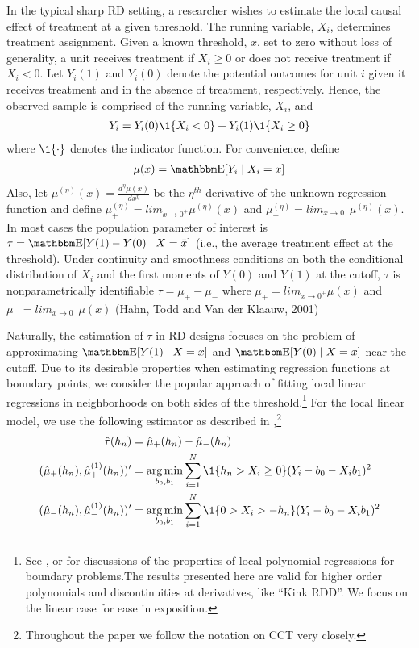 \documentclass[12pt,fleqn]{article}
\begin{document}
In the typical sharp RD setting, a researcher wishes to estimate the local 
causal effect of treatment at a given threshold. The running variable, $X_{i}$, 
determines treatment assignment.  Given a known threshold, $\bar{x}$, set to 
zero without loss of generality, a unit receives treatment if $X_{i} \geq 0$ or 
does not receive treatment if $X_{i} < 0$. Let $Y_{i}(1)$ and $Y_{i}(0)$ denote 
the potential outcomes for unit $i$ given it receives treatment and
 in the absence of treatment, respectively. Hence, the observed sample is 
 comprised of the running variable, $X_{i}$, and
 \begin{align}
  Y_{i}=Y_{i}(0) \1\{X_{i}<0\}+Y_{i}(1) \1\{X_{i} \geq 0\}
 \end{align}
where $\1\{ \cdot\}$ denotes the indicator function. For convenience,
define
 \begin{align}
  \mu(x)= \E[Y_{i} \mid X_{i}=x]
 \end{align}
Also, let $\mu^{(\eta)}(x)=\frac{d^{\eta}\mu(x)}{dx^{\eta}}$ be the $\eta^{th}$ 
derivative of the unknown regression function and define 
$\mu^{(\eta)}_{+}=lim_{x \rightarrow 0^{+}}\mu^{(\eta)}(x)$ and 
$\mu^{(\eta)}_{-}=lim_{x \rightarrow 0^{-}}\mu^{(\eta)}(x)$.
In most cases the population parameter of interest is 
$\tau=\E[Y(1)-Y(0) \mid X=\bar{x}]$ (i.e., the average treatment effect
at the threshold). Under continuity and smoothness conditions on both the 
conditional distribution of $X_i$ and the first moments of $Y(0)$ and $Y(1)$ at
the cutoff, $\tau$ is nonparametrically identifiable
$\tau = \mu_{+}- \mu_{-}$
where $\mu_{+}=lim_{x \rightarrow 0^{+}}\mu(x)$ and
$\mu_{-}=lim_{x \rightarrow 0^{-}}\mu(x)$
(Hahn, Todd and Van der Klaauw, 2001)

Naturally, the estimation of $\tau$ in RD designs focuses on the 
problem of approximating $\E[Y(1) \mid X=x]$ and $\E[Y(0) \mid X=x]$
near the cutoff. Due to its desirable properties when estimating regression 
functions at boundary points, we consider the popular approach of fitting 
local linear regressions in neighborhoods on both
sides of the threshold.\footnote{See \cite{HTV2001}, \cite{Porter03} or
\cite{FanGijbels92} for discussions of the properties of local polynomial 
regressions for boundary problems.The results presented here are valid for
higher order polynomials and discontinuities at derivatives, like ``Kink RDD''. We focus on the linear case for ease in exposition.}
For the local linear model, we use the following estimator as described in 
\cite{calonico2014},\footnote{Throughout the paper we follow the
notation on CCT very closely.}
\begin{align*}
 \hat{\tau}(h_{n})&=\hat {\mu}_{+}(h_{n}) -\hat{\mu}_{-}(h_{n})\\
(\hat {\mu}_{+}(h_{n}),\hat {\mu}^{(1)}_{+}(h_{n}))'&= \argmin_{b_{0},b_{1}}
\sum_{i=1}^{N}\1\{h_n > X_{i} \geq 0\}(Y_{i}-b_{0}-X_{i}b_{1})^{2} \\
(\hat {\mu}_{-}(h_{n}),\hat {\mu}^{(1)}_{-}(h_{n}))' &= \argmin_{b_{0},b_{1}}
\sum_{i=1}^{N}\1\{0 > X_{i} > -h_n \}(Y_{i}-b_{0}-X_{i}b_{1})^{2}
\end{align*}
\end{document}
